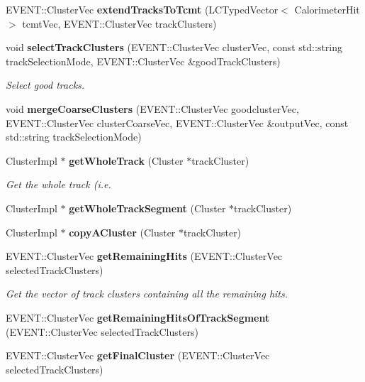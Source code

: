 \begin{DoxyCompactItemize}
\item 
EVENT::ClusterVec {\bfseries extendTracksToTcmt} (LCTypedVector$<$ CalorimeterHit $>$ tcmtVec, EVENT::ClusterVec trackClusters)\label{classCALICE_1_1AngleTrackFinder_a5722430685f5b24004bc1827dc1ccaae}

\item 
void {\bf selectTrackClusters} (EVENT::ClusterVec clusterVec, const std::string trackSelectionMode, EVENT::ClusterVec \&goodTrackClusters)
\begin{DoxyCompactList}\small\item\em Select good tracks. \item\end{DoxyCompactList}\item 
void {\bfseries mergeCoarseClusters} (EVENT::ClusterVec goodclusterVec, EVENT::ClusterVec clusterCoarseVec, EVENT::ClusterVec \&outputVec, const std::string trackSelectionMode)\label{classCALICE_1_1AngleTrackFinder_ad57cb7c54e211b1f6c79904a45611903}

\item 
ClusterImpl $\ast$ {\bf getWholeTrack} (Cluster $\ast$trackCluster)
\begin{DoxyCompactList}\small\item\em Get the whole track (i.e. \item\end{DoxyCompactList}\item 
ClusterImpl $\ast$ {\bfseries getWholeTrackSegment} (Cluster $\ast$trackCluster)\label{classCALICE_1_1AngleTrackFinder_a30c444b8e888a60ca81305ddadda9c83}

\item 
ClusterImpl $\ast$ {\bfseries copyACluster} (Cluster $\ast$trackCluster)\label{classCALICE_1_1AngleTrackFinder_a0769f3c37445bf0e8efce89f90049814}

\item 
EVENT::ClusterVec {\bf getRemainingHits} (EVENT::ClusterVec selectedTrackClusters)
\begin{DoxyCompactList}\small\item\em Get the vector of track clusters containing all the remaining hits. \item\end{DoxyCompactList}\item 
EVENT::ClusterVec {\bfseries getRemainingHitsOfTrackSegment} (EVENT::ClusterVec selectedTrackClusters)\label{classCALICE_1_1AngleTrackFinder_a13fdc56df9fcf40ed6bd8dad70ee200e}

\item 
EVENT::ClusterVec {\bfseries getFinalCluster} (EVENT::ClusterVec selectedTrackClusters)\label{classCALICE_1_1AngleTrackFinder_af37cc1b4e139645ca4578d224f019fd3}


\end{DoxyCompactItemize}
